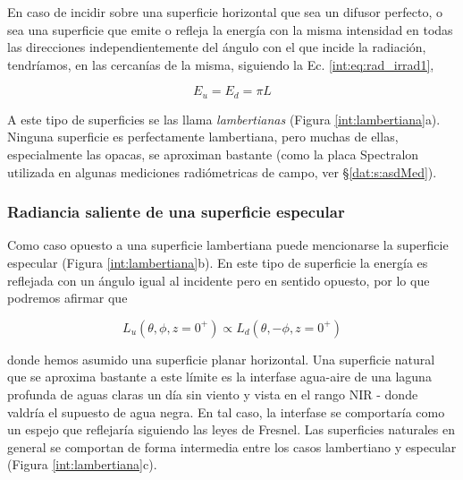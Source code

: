             En caso de incidir sobre una superficie horizontal que sea un difusor perfecto, o sea una superficie que emite o refleja la energía con la misma intensidad en todas las direcciones independientemente del ángulo con el que incide la radiación, tendríamos, en las cercanías de la misma, siguiendo la Ec. \ref{int:eq:rad_irrad1},
            
            \begin{equation}
            E_{u}=E_{d}=\pi L
            \label{int:eq:lambertiana}
            \end{equation}
            
            A este tipo de superficies se las llama \textit{lambertianas} (Figura \ref{int:lambertiana}a).
            Ninguna superficie es perfectamente lambertiana, pero muchas de ellas, especialmente las opacas, se aproximan bastante (como la placa Spectralon utilizada en algunas mediciones radiómetricas de campo, ver \S \ref{dat:s:asdMed}).
        
        \subsubsection{Radiancia saliente de una superficie especular}
        \label{int:s:especular}
        
            Como caso opuesto a una superficie lambertiana puede mencionarse la superficie especular (Figura \ref{int:lambertiana}b). En este tipo de superficie la energía es reflejada con un ángulo igual al incidente pero en sentido opuesto, por lo que podremos afirmar que
            
            \begin{equation}
            L_{u}(\theta,\phi, z = 0^{+}) \propto L_{d}(\theta,-\phi, z = 0^{+})
            \label{int:eq:especular}
            \end{equation}
            
            \noindent donde hemos asumido una superficie planar horizontal. Una superficie natural que se aproxima bastante a este límite es la interfase agua-aire de una laguna profunda de aguas claras un día sin viento y vista en el rango NIR - donde valdría el supuesto de agua negra. En tal caso, la interfase se comportaría como un espejo que reflejaría siguiendo las leyes de Fresnel. Las superficies naturales en general se comportan de forma intermedia entre los casos lambertiano y especular (Figura \ref{int:lambertiana}c).
            
